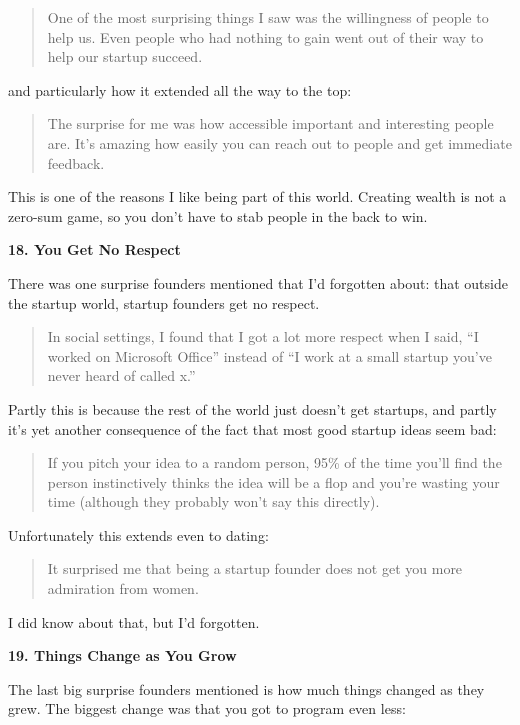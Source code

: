 \documentclass[12pt]{book}
\begin{document}
\begin{quote}
One of the most surprising things I saw was the willingness of people to
help us. Even people who had nothing to gain went out of their way to
help our startup succeed.
\end{quote}

and particularly how it extended all the way to the top:

\begin{quote}
The surprise for me was how accessible important and interesting people
are. It's amazing how easily you can reach out to people and get
immediate feedback.
\end{quote}

This is one of the reasons I like being part of this world. Creating
wealth is not a zero-sum game, so you don't have to stab people in the
back to win.

\textbf{18. You Get No Respect}

There was one surprise founders mentioned that I'd forgotten about: that
outside the startup world, startup founders get no respect.

\begin{quote}
In social settings, I found that I got a lot more respect when I said,
``I worked on Microsoft Office'' instead of ``I work at a small startup
you've never heard of called x.''
\end{quote}

Partly this is because the rest of the world just doesn't get startups,
and partly it's yet another consequence of the fact that most good
startup ideas seem bad:

\begin{quote}
If you pitch your idea to a random person, 95\% of the time you'll find
the person instinctively thinks the idea will be a flop and you're
wasting your time (although they probably won't say this directly).
\end{quote}

Unfortunately this extends even to dating:

\begin{quote}
It surprised me that being a startup founder does not get you more
admiration from women.
\end{quote}

I did know about that, but I'd forgotten.

\textbf{19. Things Change as You Grow}

The last big surprise founders mentioned is how much things changed as
they grew. The biggest change was that you got to program even less:
\end{document}
